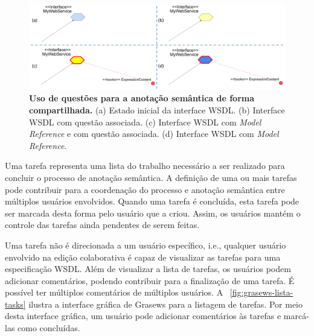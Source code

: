 \begin{figure}[h]
        \includegraphics[scale=0.3]{4-grasews/imagens/grasews-anotacao-semantica-compartilhada-com-questoes.png}
    \centering
    \caption[Uso de questões para a anotação semântica de forma compartilhada]{\textbf{Uso de questões para a anotação semântica de forma compartilhada.} (a) Estado inicial da interface WSDL. (b) Interface WSDL com questão associada. (c) Interface WSDL com \textit{Model Reference} e com questão associada. (d) Interface WSDL com \textit{Model Reference}.}
    \label{fig:grasews-anotacao-semantica-compartilhada-com-questoes}
\end{figure}

Uma tarefa representa uma lista do trabalho necessário a ser realizado para concluir o processo de anotação semântica. A definição de uma ou mais tarefas pode contribuir para a coordenação do processo e anotação semântica entre múltiplos usuários envolvidos. Quando uma tarefa é concluída, esta tarefa pode ser marcada desta forma pelo usuário que a criou. Assim, os usuários mantém o controle das tarefas ainda pendentes de serem feitas.

Uma tarefa não é direcionada a um usuário específico, i.e., qualquer usuário envolvido na edição colaborativa é capaz de visualizar as tarefas para uma especificação WSDL. Além de visualizar a lista de tarefas, os usuários podem adicionar comentários, podendo contribuir para a finalização de uma tarefa. É possível ter múltiplos comentários de múltiplos usuários. A \figurename~\ref{fig:grasews-lista-tasks} ilustra a interface gráfica de Grasews para a listagem de tarefas. Por meio desta interface gráfica, um usuário pode adicionar comentários às tarefas e marcá-las como concluídas.

